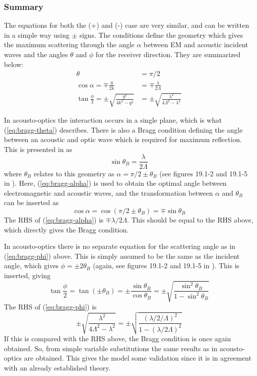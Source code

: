 \documentclass[10pt,a4paper,draft]{scrartcl}
\begin{document}
	\subsubsection{Summary}
	The equations for both the (+) and (-) case are very similar, and can be written in a simple way using $\pm$ signs. The conditions define the geometry which gives the maximum scattering through the angle $\alpha$ between EM and acoustic incident waves and the angles $\theta$ and $\phi$ for the receiver direction. They are summarized below:
	\begin{align}
			\theta &= \pi/2 \label{eq:bragg-theta}\\
			\cos{\alpha} = \mp \frac{q}{2k} &= \mp \frac{\lambda}{2\Lambda} \label{eq:bragg-alpha}\\
			\tan{\frac{\phi}{2}} = \pm \sqrt{\frac{q^2}{4k^2-q^2}} &= \pm \sqrt{\frac{\lambda^2}{4\Lambda^2-\lambda^2}} \label{eq:bragg-phi}
	\end{align}
	
	In acousto-optics the interaction occurs in a single plane, which is what (\ref{eq:bragg-theta}) describes. There is also a Bragg condition defining the angle between an acoustic and optic wave which is required for maximum reflection. This is presented in \cite{Saleh2007} as
	\begin{equation*}
		\sin{\theta_B} = \frac{\lambda}{2\Lambda}
	\end{equation*}
	where $\theta_B$ relates to this geometry as $\alpha = \pi/2 \pm \theta_B$ (see figures 19.1-2 and 19.1-5 in \cite{Saleh2007}). Here, (\ref{eq:bragg-alpha}) is used to obtain the optimal angle between electromagnetic and acoustic waves, and the transformation between $\alpha$ and $\theta_B$ can be inserted as
	\begin{equation*}
		\cos{\alpha} = \cos(\pi/2 \pm \theta_B) = \mp \sin{\theta_B}
	\end{equation*}
	The RHS of (\ref{eq:bragg-alpha}) is $\mp \lambda/2\Lambda$. This should be equal to the RHS above, which directly gives the Bragg condition.
	
	In acousto-optics there is no separate equation for the scattering angle as in (\ref{eq:bragg-phi}) above. This is simply assumed to be the same as the incident angle, which gives $\phi = \pm 2\theta_B$ (again, see figures 19.1-2 and 19.1-5 in \cite{Saleh2007}). This is inserted, giving
	\begin{equation*}
		\tan{\frac{\phi}{2}} = \tan(\pm \theta_B) = \pm \frac{\sin{\theta_B}}{\cos{\theta_B}} = \pm \sqrt{\frac{\sin^2{\theta_B}}{1-\sin^2{\theta_B}}}
	\end{equation*}
	The RHS of (\ref{eq:bragg-phi}) is
	\begin{equation*}
		\pm \sqrt{\frac{\lambda^2}{4\Lambda^2-\lambda^2}} = \pm \sqrt{\frac{(\lambda/2/\Lambda)^2}{1-(\lambda/2\Lambda)^2}}
	\end{equation*}
	If this is compared with the RHS above, the Bragg condition is once again obtained.
	So, from simple variable substitutions the same results as in acousto-optics are obtained. This gives the model some validation since it is in agreement with an already established theory.
	
\end{document}
